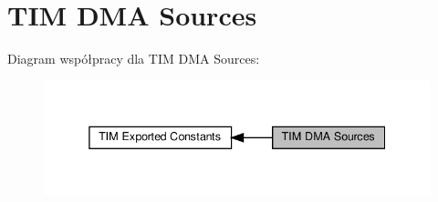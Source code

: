 \hypertarget{group___t_i_m___d_m_a__sources}{}\section{T\+IM D\+MA Sources}
\label{group___t_i_m___d_m_a__sources}
Diagram współpracy dla T\+IM D\+MA Sources\+:\nopagebreak
\begin{figure}[H]
\begin{center}
\leavevmode
\includegraphics[width=338pt]{group___t_i_m___d_m_a__sources}
\end{center}
\end{figure}
